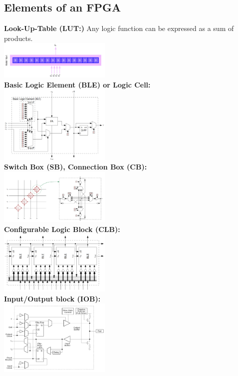 	\subsection{Elements of an FPGA }
		\begin{multicols}{2}
			\textbf{Look-Up-Table (LUT:)} Any logic function can be expressed as a sum of products. \\
			\includegraphics[width=0.4\textwidth]{./pictures/LUT.png} \\
			\textbf{Basic Logic Element (BLE) or Logic Cell:} \\
			\includegraphics[width=0.4\textwidth]{./pictures/ble.png} \\
			\textbf{Switch Box (SB), Connection Box (CB):} \\
			\includegraphics[width=0.4\textwidth]{./pictures/sb.png} \\
			\textbf{Configurable Logic Block (CLB):} \\
			\includegraphics[width=0.4\textwidth]{./pictures/clb.png} \\ 		
			\textbf{Input/Output block (IOB):}  \\
			\includegraphics[width=0.4\textwidth]{./pictures/iob.png} \\

\end{multicols}
